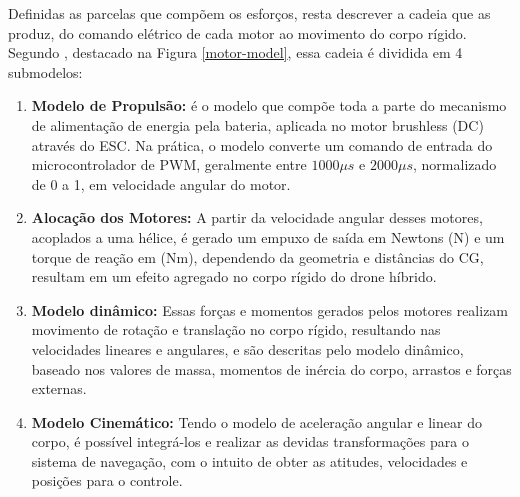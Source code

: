 {\color{blue}Definidas as parcelas que compõem os esforços, resta descrever a cadeia que as produz, do comando elétrico de cada motor ao movimento do corpo rígido.} Segundo \textcite{Quan2017}, destacado na Figura \ref{motor-model}, {\color{blue}essa cadeia} é dividida em 4 submodelos:

\begin{enumerate}
  \item \textbf{Modelo de Propulsão:} é o modelo que compõe toda a parte do mecanismo de alimentação de energia pela bateria, aplicada no motor brushless (DC) através do \gls{ESC}. Na prática, o modelo converte um comando de entrada do microcontrolador de PWM, geralmente entre $1000\mu s$ e $2000\mu s$, normalizado de 0 a 1, em velocidade angular do motor.

  \item \textbf{Alocação dos Motores:} A partir da velocidade angular desses motores, acoplados a uma hélice, é gerado um empuxo de saída em Newtons (N) e um torque de reação em (Nm), dependendo da geometria e distâncias do CG, resultam em um efeito agregado no corpo rígido do drone híbrido.
  
  \item \textbf{Modelo dinâmico:} Essas forças e momentos gerados pelos motores realizam movimento de rotação e translação no corpo rígido, resultando nas velocidades lineares e angulares, e são descritas pelo modelo dinâmico, baseado nos valores de massa, momentos de inércia do corpo, arrastos e forças externas.
  
  \item \textbf{Modelo Cinemático:} Tendo o modelo de aceleração angular e linear do corpo, é possível integrá-los e realizar as devidas transformações para o sistema de navegação, com o intuito de obter as atitudes, velocidades e posições para o controle.
\end{enumerate}

